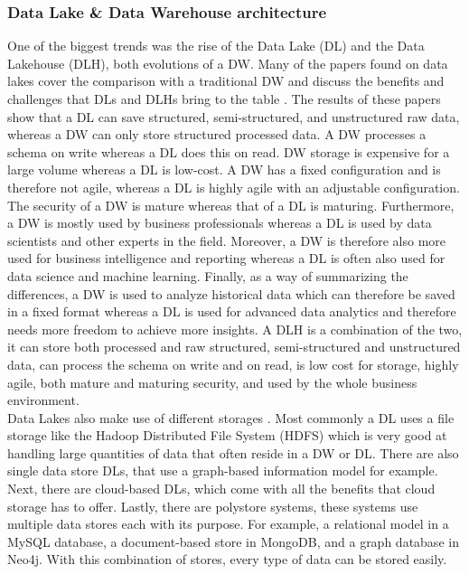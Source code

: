 \documentclass[11pt]{article}
\begin{document}
\subsubsection{Data Lake \& Data Warehouse architecture}
\label{results:trends:design}
One of the biggest trends was the rise of the Data Lake (DL) and the Data Lakehouse (DLH), both evolutions of a DW. Many of the papers found on data lakes cover the comparison with a traditional DW and discuss the benefits and challenges that DLs and DLHs bring to the table \cite{Li2023, Chen2022405, Singh2022530, Orescanin20211242, Liu2020, Kachaoui2019, Giebler2019179, Ravat2019304}. The results of these papers show that a DL can save structured, semi-structured, and unstructured raw data, whereas a DW can only store structured processed data. A DW processes a schema on write whereas a DL does this on read. DW storage is expensive for a large volume whereas a DL is low-cost. A DW has a fixed configuration and is therefore not agile, whereas a DL is highly agile with an adjustable configuration. The security of a DW is mature whereas that of a DL is maturing. Furthermore, a DW is mostly used by business professionals whereas a DL is used by data scientists and other experts in the field. Moreover, a DW is therefore also more used for business intelligence and reporting whereas a DL is often also used for data science and machine learning. Finally, as a way of summarizing the differences, a DW is used to analyze historical data which can therefore be saved in a fixed format whereas a DL is used for advanced data analytics and therefore needs more freedom to achieve more insights. A DLH is a combination of the two, it can store both processed and raw structured, semi-structured and unstructured data, can process the schema on write and on read, is low cost for storage, highly agile, both mature and maturing security, and used by the whole business environment. \\

Data Lakes also make use of different storages \cite{Singh2022530}. Most commonly a DL uses a file storage like the Hadoop Distributed File System (HDFS) which is very good at handling large quantities of data that often reside in a DW or DL. There are also single data store DLs, that use a graph-based information model for example. Next, there are cloud-based DLs, which come with all the benefits that cloud storage has to offer. Lastly, there are polystore systems, these systems use multiple data stores each with its purpose. For example, a relational model in a MySQL database, a document-based store in MongoDB, and a graph database in Neo4j. With this combination of stores, every type of data can be stored easily. \\
\end{document}
